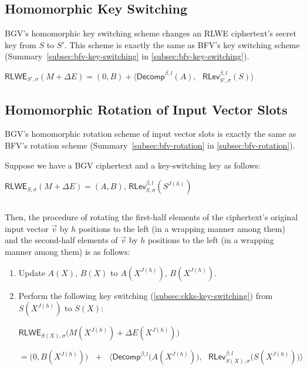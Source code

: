 \subsection{Homomorphic Key Switching}
\label{subsec:bgv-key-switching}

BGV's homomorphic key switching scheme changes an RLWE ciphertext's secret key from $S$ to $S'$. This scheme is exactly the same as BFV's key switching scheme (Summary~\ref*{subsec:bfv-key-switching} in \autoref{subsec:bfv-key-switching}).

\begin{tcolorbox}[title={\textbf{\tboxlabel{\ref*{subsec:bgv-key-switching}} BGV's Key Switching}}]
$\textsf{RLWE}_{S',\sigma}(M + \Delta E) = (0, B) + \bm{\langle} \textsf{Decomp}^{\beta, l}(A), \text{ } \textsf{RLev}_{S', \sigma}^{\beta, l}(S) \bm{\rangle}$
\end{tcolorbox}



\subsection{Homomorphic Rotation of Input Vector Slots}
\label{subsec:bgv-rotation}


BGV's homomorphic rotation scheme of input vector slots is exactly the same as BFV's rotation scheme (Summary~\ref*{subsec:bfv-rotation} in \autoref{subsec:bfv-rotation}). 


\begin{tcolorbox}[title={\textbf{\tboxlabel{\ref*{subsec:bgv-rotation}} BGV's Homomorphic Rotation of Input Vector Slots}}]


Suppose we have a BGV ciphertext and a key-switching key as follows:

$\textsf{RLWE}_{S, \sigma}(M + \Delta E) = (A, B)$, \text{ } $\textsf{RLev}_{S, \sigma}^{\beta, l}(S^{J(h)})$

$ $

Then, the procedure of rotating the first-half elements of the ciphertext's original input vector $\vec{v}$ by $h$ positions to the left (in a wrapping manner among them) and the second-half elements of $\vec{v}$ by $h$ positions to the left (in a wrapping manner among them) is as follows: 

\begin{enumerate}
\item Update $A(X)$, $B(X)$ to $A(X^{J(h)})$, $B(X^{J(h)})$. 
\item Perform the following key switching (\autoref{subsec:ckks-key-switching}) from $S(X^{J(h)})$ to $S(X)$:

$\textsf{RLWE}_{S(X),\sigma}\bm{(} M(X^{J(h)}) + \Delta E(X^{J(h)})\bm{)} $

$= \bm{(} 0, B(X^{J(h)}) \bm{)} \text{ } + \text{ } \bm{\langle}  \textsf{Decomp}^{\beta, l}\bm{(}A(X^{J(h)})\bm{)}, \text{ } \textsf{RLev}_{S(X), \sigma}^{\beta, l}\bm{(}S(X^{J(h)})\bm{)} \bm{\rangle}$
\end{enumerate}


\end{tcolorbox}




